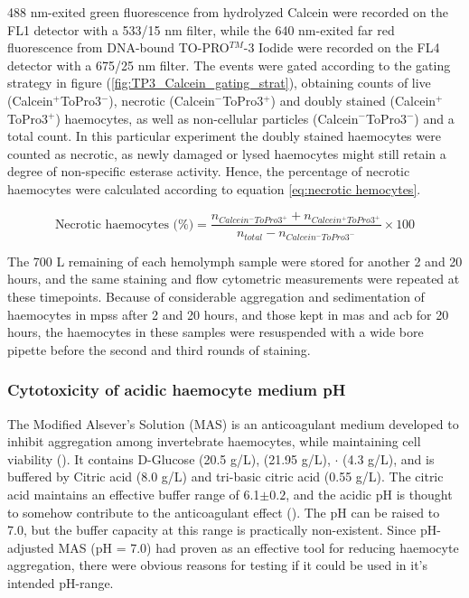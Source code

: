 488 nm-exited green fluorescence from hydrolyzed Calcein were recorded on the FL1 detector with a 533/15 nm filter, while the 640 nm-exited far red fluorescence from DNA-bound TO-PRO$^{TM}$-3 Iodide were recorded on the FL4 detector with a 675/25 nm filter. The events were gated according to the gating strategy in figure (\ref{fig:TP3_Calcein_gating_strat}), obtaining counts of live (Calcein$^{+}$ToPro3$^{-}$), necrotic (Calcein$^{-}$ToPro3$^{+}$) and doubly stained (Calcein$^{+}$ToPro3$^{+}$) haemocytes, as well as non-cellular particles (Calcein$^{-}$ToPro3$^{-}$) and a total count. In this particular experiment the doubly stained haemocytes were counted as necrotic, as newly damaged or lysed haemocytes might still retain a degree of non-specific esterase activity. Hence, the percentage of necrotic haemocytes were calculated according to equation \ref{eq:necrotic hemocytes}.

\begin{equation}
    \label{eq:necrotic hemocytes}
    \text{Necrotic haemocytes (\%)} = \dfrac{n_{Calcein^{-}ToPro3^{+}} + n_{Calcein^{+}ToPro3^{+}}}{n_{total} - n_{Calcein^{-}ToPro3^{-}}} \times 100
\end{equation}

The 700 \micro L remaining of each hemolymph sample were stored for another 2 and 20 hours, and the same staining and flow cytometric measurements were repeated at these timepoints. Because of considerable aggregation and sedimentation of haemocytes in \acrshort{mpss} after 2 and 20 hours, and those kept in \acrshort{mas} and \acrshort{acb} for 20 hours, the haemocytes in these samples were resuspended with a wide bore pipette before the second and third rounds of staining.

\subsubsection{Cytotoxicity of acidic haemocyte medium pH}
The Modified Alsever's Solution (MAS) is an anticoagulant medium developed to inhibit aggregation among invertebrate haemocytes, while maintaining cell viability (\cite{Bachere1988}). It contains D-Glucose (20.5 g/L),  (21.95 g/L), $\cdot$ (4.3 g/L), and is buffered by Citric acid (8.0 g/L) and tri-basic citric acid (0.55 g/L). The citric acid maintains an effective buffer range of 6.1$\pm{0.2}$, and the acidic pH is thought to somehow contribute to the anticoagulant effect (\cite{Söderhall1983, Renwartz1990}). The pH can be raised to 7.0, but the buffer capacity at this range is practically non-existent. Since pH-adjusted MAS (pH = 7.0) had proven as an effective tool for reducing haemocyte aggregation, there were obvious reasons for testing if it could be used in it's intended pH-range.

